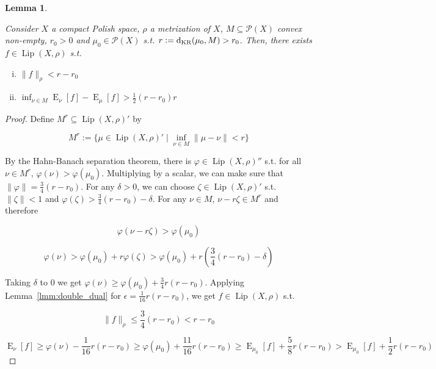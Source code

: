 \documentclass[11pt]{article}
\theoremstyle{definition}
\theoremstyle{plain}
\newtheorem{lemma}{Lemma}%
\newcommand{\N}[1]{\lVert #1 \rVert}
\DeclareMathOperator{\E}{E}
\newcommand{\PM}{\mathcal{P}}
\newcommand{\Lp}{{\operatorname{Lip}}}
\newcommand{\DKR}{\operatorname{d}_{\textnormal{KR}}}
\begin{document}
\begin{samepage}
\begin{lemma}
\label{lmm:separation}

Consider $X$ a compact Polish space, $\rho$ a metrization of $X$, $M \subseteq \PM(X)$ convex non-empty, $r_0 > 0$ and $\mu_0 \in \PM(X)$ s.t. $r:=\DKR(\mu_0,M) > r_0$. Then, there exists $f \in \Lp(X,\rho)$ s.t.

\begin{enumerate}[i.]

\item $\N{f}_\rho < r - r_0$
\item $\inf_{\nu \in M} \E_\nu[f] - \E_\mu[f] > \frac{1}{2}(r-r_0)r$

\end{enumerate}

\end{lemma}
\end{samepage}

\begin{proof}

Define $M^r \subseteq \Lp(X,\rho)'$ by

$$M^r:=\{\mu \in \Lp(X,\rho)' \mid \inf_{\nu \in M} \N{\mu - \nu} < r\}$$

By the Hahn-Banach separation theorem, there is $\varphi \in \Lp(X,\rho)''$ s.t. for all $\nu \in M^r$, $\varphi(\nu) > \varphi(\mu_0)$. Multiplying by a scalar, we can make sure that $\N{\varphi} = \frac{3}{4}(r - r_0)$. For any $\delta > 0$, we can choose $\zeta \in \Lp(X,\rho)'$ s.t. $\N{\zeta} < 1$ and $\varphi(\zeta) > \frac{3}{4}(r-r_0) - \delta$.  For any $\nu \in M$, $\nu - r \zeta \in M^r$ and therefore

$$\varphi(\nu - r \zeta) > \varphi(\mu_0)$$

$$\varphi(\nu) > \varphi(\mu_0) + r \varphi(\zeta) > \varphi(\mu_0) + r (\frac{3}{4}(r-r_0) - \delta)$$

Taking $\delta$ to 0 we get $\varphi(\nu) \geq \varphi(\mu_0) + \frac{3}{4} r (r - r_0)$. Applying Lemma~\ref{lmm:double_dual} for $\epsilon = \frac{1}{16} r (r - r_0)$, we get $f \in \Lp(X,\rho)$ s.t.

$$\N{f}_\rho \leq \frac{3}{4} (r - r_0) < r - r_0$$ 

$$\E_\nu[f] \geq \varphi(\nu) - \frac{1}{16} r (r - r_0) \geq \varphi(\mu_0) + \frac{11}{16} r (r - r_0) \geq \E_{\mu_0}[f] +  \frac{5}{8} r (r - r_0) > \E_{\mu_0}[f] +  \frac{1}{2} r (r - r_0)$$
\end{proof}
\end{document}
